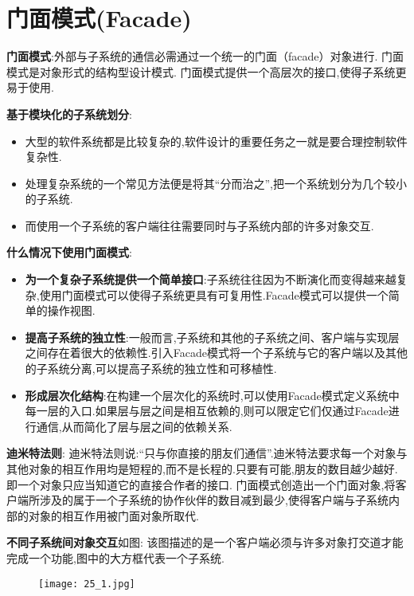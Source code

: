 \documentclass[../main.tex]{subfiles}
\begin{document}
\section{门面模式(Facade)}
\textbf{门面模式}:外部与子系统的通信必需通过一个统一的门面（facade）对象进行.
门面模式是对象形式的结构型设计模式.
门面模式提供一个高层次的接口,使得子系统更易于使用.

\textbf{基于模块化的子系统划分}:
\begin{itemize}
  \item 大型的软件系统都是比较复杂的,软件设计的重要任务之一就是要合理控制软件复杂性.
  \item 处理复杂系统的一个常见方法便是将其``分而治之'',把一个系统划分为几个较小的子系统.
  \item 而使用一个子系统的客户端往往需要同时与子系统内部的许多对象交互.
\end{itemize}
%
\textbf{什么情况下使用门面模式}:
\begin{itemize}
  \item \textbf{为一个复杂子系统提供一个简单接口}:子系统往往因为不断演化而变得越来越复杂,使用门面模式可以使得子系统更具有可复用性.Facade模式可以提供一个简单的操作视图.
  \item \textbf{提高子系统的独立性}:一般而言,子系统和其他的子系统之间、客户端与实现层之间存在着很大的依赖性.引入Facade模式将一个子系统与它的客户端以及其他的子系统分离,可以提高子系统的独立性和可移植性.
  \item \textbf{形成层次化结构}:在构建一个层次化的系统时,可以使用Facade模式定义系统中每一层的入口.如果层与层之间是相互依赖的,则可以限定它们仅通过Facade进行通信,从而简化了层与层之间的依赖关系.
\end{itemize}
%
\textbf{迪米特法则}:
迪米特法则说:``只与你直接的朋友们通信''.迪米特法要求每一个对象与其他对象的相互作用均是短程的,而不是长程的.只要有可能,朋友的数目越少越好.即一个对象只应当知道它的直接合作者的接口.
门面模式创造出一个门面对象,将客户端所涉及的属于一个子系统的协作伙伴的数目减到最少,使得客户端与子系统内部的对象的相互作用被门面对象所取代.

\textbf{不同子系统间对象交互}如图:
该图描述的是一个客户端必须与许多对象打交道才能完成一个功能,图中的大方框代表一个子系统.
\begin{figure}[H]
  \texttt{[image: 25\_1.jpg]}
\end{figure}
%
\end{document}
